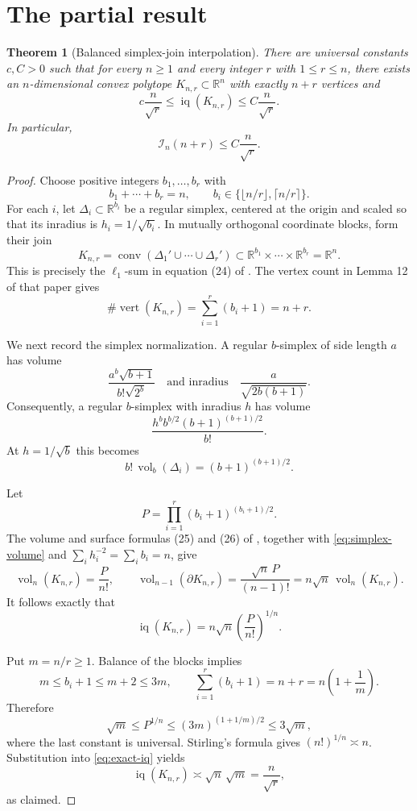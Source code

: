 \documentclass[11pt]{article}
\newtheorem{theorem}{Theorem}
\newcommand{\vol}{\operatorname{vol}}
\newcommand{\iq}{\operatorname{iq}}
\begin{document}
\section{The partial result}

\begin{theorem}[Balanced simplex-join interpolation]\label{thm:main}
There are universal constants $c,C>0$ such that for every $n\ge1$ and every
integer $r$ with $1\le r\le n$, there exists an $n$-dimensional convex
polytope $K_{n,r}\subset\mathbb R^n$ with exactly $n+r$ vertices and
\[
  c\frac{n}{\sqrt r}\le \iq(K_{n,r})\le C\frac{n}{\sqrt r}.
\]
In particular,
\[
  \mathcal I_n(n+r)\le C\frac{n}{\sqrt r}.
\]
\end{theorem}

\begin{proof}
Choose positive integers $b_1,\ldots,b_r$ with
\[
 b_1+\cdots+b_r=n,
 \qquad b_i\in\{\lfloor n/r\rfloor,\lceil n/r\rceil\}.
\]
For each $i$, let $\Delta_i\subset\mathbb R^{b_i}$ be a regular simplex,
centered at the origin and scaled so that its inradius is
$h_i=1/\sqrt{b_i}$.  In mutually orthogonal coordinate blocks, form their
join
\[
 K_{n,r}=\operatorname{conv}(\Delta_1'\cup\cdots\cup\Delta_r')
 \subset \mathbb R^{b_1}\times\cdots\times\mathbb R^{b_r}=\mathbb R^n.
\]
This is precisely the $\ell_1$-sum in equation (24) of \cite{BBN}.  The
vertex count in Lemma 12 of that paper gives
\[
  \#\operatorname{vert}(K_{n,r})=
  \sum_{i=1}^r(b_i+1)=n+r.
\]

We next record the simplex normalization.  A regular $b$-simplex of side
length $a$ has volume
\[
 \frac{a^b\sqrt{b+1}}{b!\sqrt{2^b}}
 \quad\text{and inradius}\quad
 \frac{a}{\sqrt{2b(b+1)}}.
\]
Consequently, a regular $b$-simplex with inradius $h$ has volume
\[
 \frac{h^b b^{b/2}(b+1)^{(b+1)/2}}{b!}.
\]
At $h=1/\sqrt b$ this becomes
\begin{equation}\label{eq:simplex-volume}
 b!\,\vol_b(\Delta_i)=(b+1)^{(b+1)/2}.
\end{equation}

Let
\[
  P=\prod_{i=1}^r (b_i+1)^{(b_i+1)/2}.
\]
The volume and surface formulas (25) and (26) of \cite{BBN}, together with
\eqref{eq:simplex-volume} and $\sum_i h_i^{-2}=\sum_i b_i=n$, give
\[
 \vol_n(K_{n,r})=\frac{P}{n!},
 \qquad
 \vol_{n-1}(\partial K_{n,r})
   =\frac{\sqrt n\,P}{(n-1)!}
   =n\sqrt n\,\vol_n(K_{n,r}).
\]
It follows exactly that
\begin{equation}\label{eq:exact-iq}
 \iq(K_{n,r})
   =n\sqrt n\left(\frac{P}{n!}\right)^{1/n}.
\end{equation}

Put $m=n/r\ge1$.  Balance of the blocks implies
\[
 m\le b_i+1\le m+2\le3m,
 \qquad
 \sum_{i=1}^r(b_i+1)=n+r=n\left(1+\frac1m\right).
\]
Therefore
\[
 \sqrt m
 \le P^{1/n}
 \le (3m)^{(1+1/m)/2}
 \le 3\sqrt m,
\]
where the last constant is universal.  Stirling's formula gives
$(n!)^{1/n}\asymp n$.  Substitution into \eqref{eq:exact-iq} yields
\[
 \iq(K_{n,r})\asymp \sqrt n\,\sqrt m
 =\frac{n}{\sqrt r},
\]
as claimed.
\end{proof}
\end{document}
